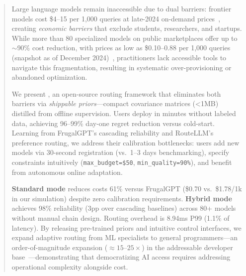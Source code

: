 
\begin{abstract}
Large language models remain inaccessible due to dual barriers: frontier models cost \$4--15 per 1,000 queries at late-2024 on-demand prices~\cite{openai2025pricing,anthropic2025pricing}, creating \emph{economic barriers} that exclude students, researchers, and startups. While more than 80 specialized models on public marketplaces offer up to $\sim$90\% cost reduction, with prices as low as \$0.10--0.88 per 1,000 queries (snapshot as of December 2024)~\cite{openrouter2025models,artificialanalysis2025}, practitioners lack accessible tools to navigate this fragmentation, resulting in systematic over-provisioning or abandoned optimization.

We present \ours{}, an open-source routing framework that eliminates both barriers via \emph{shippable priors}---compact covariance matrices (<1MB) distilled from offline supervision. Users deploy in minutes without labeled data, achieving 96--99\% day-one regret reduction versus cold-start. Learning from FrugalGPT's cascading reliability and RouteLLM's preference routing, we address their calibration bottlenecks: users add new models via 30-second registration (vs.\ 1--3 days benchmarking), specify constraints intuitively (\texttt{max\_budget=\$50}, \texttt{min\_quality=90\%}), and benefit from autonomous online adaptation.

\textbf{Standard mode} reduces costs 61\% versus FrugalGPT (\$0.70 vs.\ \$1.78/1k in our simulation) despite zero calibration requirements. \textbf{Hybrid mode} achieves 98\% reliability (3pp over cascading baselines) across 80+ models without manual chain design. Routing overhead is 8.94ms P99 (1.1\% of latency). By releasing pre-trained priors and intuitive control interfaces, we expand adaptive routing from ML specialists to general programmers---an order-of-magnitude expansion ($\approx 15$--$25\times$) in the addressable developer base~\cite{stackoverflow2024survey,github2025developer}---demonstrating that democratizing AI access requires addressing operational complexity alongside cost.
\end{abstract}

